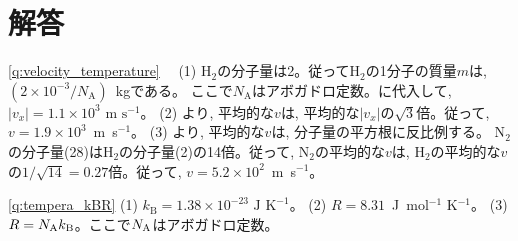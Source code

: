 \section{解答}

\ref{q:velocity_temperature}　
(1) H$_2$の分子量は2。従ってH$_2$の1分子の質量$m$は, $(2\times10^{-3}/N_\text{A})$~kgである。
ここで$N_\text{A}$はアボガドロ定数。に代入して, 
$|v_x|=1.1\times10^{3}\text{ m s}^{-1}$。
(2) より, 平均的な$v$は, 平均的な$|v_x|$の$\sqrt{3}$倍。従って, $v=1.9\times10^{3}$~m~s$^{-1}$。
(3) より, 平均的な$v$は, 分子量の平方根に反比例する。
N$_2$の分子量(28)はH$_2$の分子量(2)の14倍。従って, N$_2$の平均的な$v$は, H$_2$の平均的な$v$の$1/\sqrt{14}=0.27$倍。従って, 
$v=5.2\times10^{2}$~m~s$^{-1}$。

\ref{q:tempera_kBR}
(1) $k_{\text{B}}=1.38\times10^{-23} \text{ J K}^{-1}$。
(2) $R=8.31$~J~mol$^{-1}$ K$^{-1}$。
(3) $R=N_{\text A}k_{\text B}$。ここで$N_{\text A}$はアボガドロ定数。
